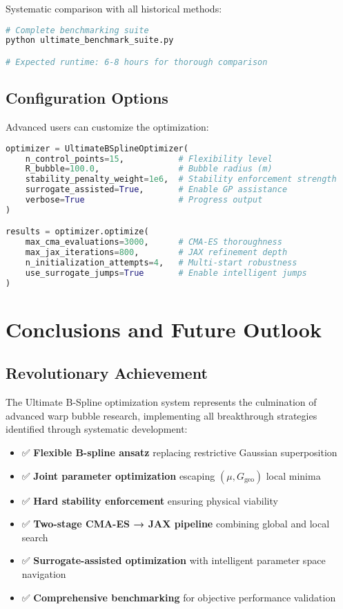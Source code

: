 \documentclass[11pt,a4paper]{article}
\begin{document}
Systematic comparison with all historical methods:

\begin{lstlisting}[language=bash]
# Complete benchmarking suite
python ultimate_benchmark_suite.py

# Expected runtime: 6-8 hours for thorough comparison
\end{lstlisting}

\subsection{Configuration Options}

Advanced users can customize the optimization:

\begin{lstlisting}[language=Python]
optimizer = UltimateBSplineOptimizer(
    n_control_points=15,           # Flexibility level
    R_bubble=100.0,                # Bubble radius (m)
    stability_penalty_weight=1e6,  # Stability enforcement strength
    surrogate_assisted=True,       # Enable GP assistance
    verbose=True                   # Progress output
)

results = optimizer.optimize(
    max_cma_evaluations=3000,      # CMA-ES thoroughness
    max_jax_iterations=800,        # JAX refinement depth
    n_initialization_attempts=4,   # Multi-start robustness
    use_surrogate_jumps=True       # Enable intelligent jumps
)
\end{lstlisting}

\section{Conclusions and Future Outlook}

\subsection{Revolutionary Achievement}

The Ultimate B-Spline optimization system represents the culmination of advanced warp bubble research, implementing all breakthrough strategies identified through systematic development:

\begin{itemize}
\item ✅ \textbf{Flexible B-spline ansatz} replacing restrictive Gaussian superposition
\item ✅ \textbf{Joint parameter optimization} escaping $(\mu, G_{\text{geo}})$ local minima
\item ✅ \textbf{Hard stability enforcement} ensuring physical viability
\item ✅ \textbf{Two-stage CMA-ES → JAX pipeline} combining global and local search
\item ✅ \textbf{Surrogate-assisted optimization} with intelligent parameter space navigation
\item ✅ \textbf{Comprehensive benchmarking} for objective performance validation
\end{itemize}
\end{document}
